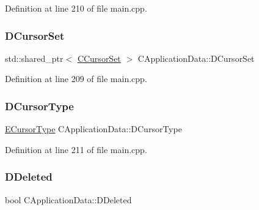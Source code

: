 Definition at line 210 of file main.\+cpp.

\hypertarget{classCApplicationData_aab67bfc9fa6708d7900ff654f9da05c7}{}\label{classCApplicationData_aab67bfc9fa6708d7900ff654f9da05c7} 
\subsubsection{\texorpdfstring{D\+Cursor\+Set}{DCursorSet}}
{\footnotesize\ttfamily std\+::shared\+\_\+ptr$<$ \hyperlink{classCCursorSet}{C\+Cursor\+Set} $>$ C\+Application\+Data\+::\+D\+Cursor\+Set\hspace{0.3cm}{\ttfamily [protected]}}



Definition at line 209 of file main.\+cpp.

\hypertarget{classCApplicationData_a931cfbda23231fb441081f231326e7ee}{}\label{classCApplicationData_a931cfbda23231fb441081f231326e7ee} 
\subsubsection{\texorpdfstring{D\+Cursor\+Type}{DCursorType}}
{\footnotesize\ttfamily \hyperlink{classCApplicationData_ad024b66b60017c45c47a85dbc636ae69}{E\+Cursor\+Type} C\+Application\+Data\+::\+D\+Cursor\+Type\hspace{0.3cm}{\ttfamily [protected]}}



Definition at line 211 of file main.\+cpp.

\hypertarget{classCApplicationData_a0a8651f95f3d48befd6e02a286ecdc82}{}\label{classCApplicationData_a0a8651f95f3d48befd6e02a286ecdc82} 
\subsubsection{\texorpdfstring{D\+Deleted}{DDeleted}}
{\footnotesize\ttfamily bool C\+Application\+Data\+::\+D\+Deleted\hspace{0.3cm}{\ttfamily [protected]}}



